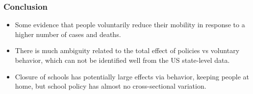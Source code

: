 \documentclass{beamer}
\begin{document}

\begin{frame}
  \frametitle{Conclusion}
  
\begin{itemize}
  
 \item Some evidence that people voluntarily reduce their mobility in response to a higher number of cases and deaths.\smallskip

 
\item There is much ambiguity related to the total effect of policies vs voluntary behavior, which can not be identified well from the US state-level data. \smallskip

\item Closure of schools has potentially large effects via behavior, keeping people at home, but school policy has almost no cross-sectional variation.\smallskip %


  
\end{itemize}
  
\end{frame}

 

\end{document}
